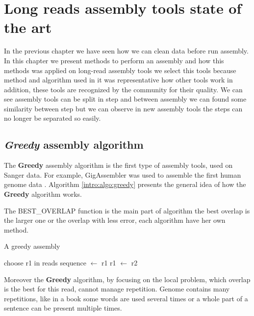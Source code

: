 \documentclass[main]{subfiles}
\begin{document}
\chapter{Long reads assembly tools state of the art}\label{chapter:sota}

In the previous chapter we have seen how we can clean data before run assembly. In this chapter we present methods to perform an assembly and how this methods was applied on long-read assembly tools we select this tools because method and algorithm used in it was representative how other tools work in addition, these tools are recognized by the community for their quality. We can see assembly tools can be split in step and between assembly we can found some similarity between step but we can observe in new assembly tools the steps can no longer be separated so easily.

\section{\textit{Greedy} assembly algorithm}

The \textbf{Greedy} assembly algorithm is the first type of assembly tools, used on Sanger data. For example, GigAssembler was used to assemble the first human genome data \cite{GigAssembler}. Algorithm \ref{intro:algo:greedy} presents the general idea of how the \textbf{Greedy} algorithm works.

The BEST\_OVERLAP function is the main part of algorithm the best overlap is the larger one or the overlap with less error, each algorithm have her own method.

\begin{algorithm}[ht]
    \caption{A greedy assembly}
    \begin{algorithmic}[1]
        \State choose r1 in reads
        \State sequence $\leftarrow$ r1
            \State {}
            \State {}
            \State r1 $\leftarrow$ r2
        \EndWhile
    \EndFunction
    \end{algorithmic}
    \label{intro:algo:greedy}
\end{algorithm}

Moreover the \textbf{Greedy} algorithm, by focusing on the local problem, which overlap is the best for this read, cannot manage repetition. Genome contains many repetitions, like in a book some words are used several times or a whole part of a sentence can be present multiple times.
\end{document}
